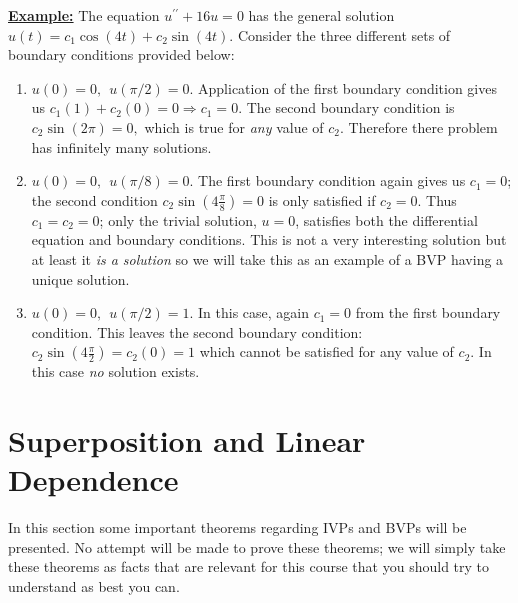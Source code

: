 \vspace{1.0cm}
\noindent \underline{\textbf{Example:}} The equation $u^{\prime \prime}+16u = 0$ has the general solution $u(t) = c_1 \cos{(4t)}+c_2 \sin{(4t)}$.  Consider the three different sets of boundary conditions provided below:
\begin{enumerate}[label=\alph*)]
\item $u(0)=0, \ \ u(\pi/2)=0$.
Application of the first boundary condition gives us $c_1(1)+c_2(0)=0 \Rightarrow c_1 = 0$.  The second boundary condition is $c_2\sin{(2 \pi)} = 0,$ which is true for \emph{any} value of $c_2$.  Therefore there problem has infinitely many solutions.
\item $u(0)=0, \ \ u(\pi/8)=0$.
The first boundary condition again gives us $c_1=0$; the second condition $c_2\sin{(4 \frac{\pi}{8})}=0$ is only satisfied if $c_2=0$.  Thus $c_1 = c_2 = 0$; only the trivial solution, $u=0$, satisfies both the differential equation and boundary conditions.  This is not a very interesting solution but at least it \emph{is a solution} so we will take this as an example of a BVP having a unique solution.
\item $u(0)=0, \ \ u(\pi/2)=1$.
In this case, again $c_1=0$ from the first boundary condition.  This leaves the second boundary condition: $c_2 \sin{\left(4 \frac{\pi}{2}\right)} = c_2(0) = 1$ which cannot be satisfied for any value of $c_2$.  In this case \emph{no} solution exists.

\end{enumerate}

\section{Superposition and Linear Dependence}  
In this section some important theorems regarding IVPs and BVPs will be presented.  No attempt will be made to prove these theorems; we will simply take these theorems as facts that are relevant for this course that you should try to understand as best you can.


